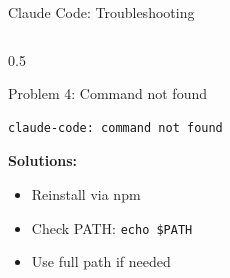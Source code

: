\documentclass[aspectratio=169,11pt]{beamer}
\begin{document}
\begin{frame}[fragile]{Claude Code: Troubleshooting}
\begin{columns}[T]
\begin{column}{0.5\textwidth}
            \begin{alertblock}{Problem 4: Command not found}
                \begin{lstlisting}[style=bash,numbers=none]
claude-code: command not found
                \end{lstlisting}
                \textbf{Solutions:}
                \begin{itemize}
                    \item Reinstall via npm
                    \item Check PATH: \texttt{echo \$PATH}
                    \item Use full path if needed
                \end{itemize}
            \end{alertblock}
        \end{column}
    \end{columns}

\end{frame}
\end{document}
